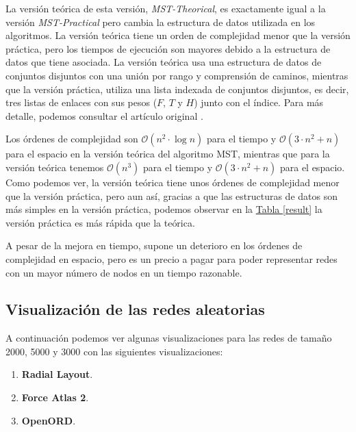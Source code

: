 \documentclass[paper=a4, fontsize=11pt]{article} %
\numberwithin{equation}{section} %
\numberwithin{figure}{section} %
\numberwithin{table}{section} %
\begin{document}
La versión teórica de esta versión, \textit{MST-Theorical}, es exactamente igual a la versión \textit{MST-Practical} pero cambia la estructura de datos utilizada en los algoritmos. La versión teórica tiene un orden de complejidad menor que la versión práctica, pero los tiempos de ejecución son mayores debido a la estructura de datos que tiene asociada. La versión teórica usa una estructura de datos de conjuntos disjuntos con una unión por rango y comprensión de caminos, mientras que la versión práctica, utiliza una lista indexada de conjuntos disjuntos, es decir, tres listas de enlaces con sus pesos ($F$, $T$ y $H$) junto con el índice. Para más detalle, podemos consultar el artículo original \cite{alg}.

Los órdenes de complejidad son $\mathcal{O}(n^2\cdot\log n)$ para el tiempo y $\mathcal{O}(3\cdot n^2+n)$ para el espacio en la versión teórica del algoritmo MST, mientras que para la versión teórica tenemos $\mathcal{O}(n^3)$ para el tiempo y $\mathcal{O}(3\cdot n^2+n)$ para el espacio. Como podemos ver, la versión teórica tiene unos órdenes de complejidad menor que la versión práctica, pero aun así, gracias a que las estructuras de datos son más simples en la versión práctica, podemos observar en la \hyperref[result]{Tabla \ref*{result}} la versión práctica es más rápida que la teórica.

A pesar de la mejora en tiempo, supone un deterioro en los órdenes de complejidad en espacio, pero es un precio a pagar para poder representar redes con un mayor número de nodos en un tiempo razonable.

\subsection{Visualización de las redes aleatorias}

A continuación podemos ver algunas visualizaciones para las redes de tamaño 2000, 5000 y 3000 con las siguientes visualizaciones:

\begin{enumerate}[$\bullet$]
  \item \textbf{Radial Layout}.
  \item \textbf{Force Atlas 2}.
  \item \textbf{OpenORD}.
\end{enumerate}
\end{document}
